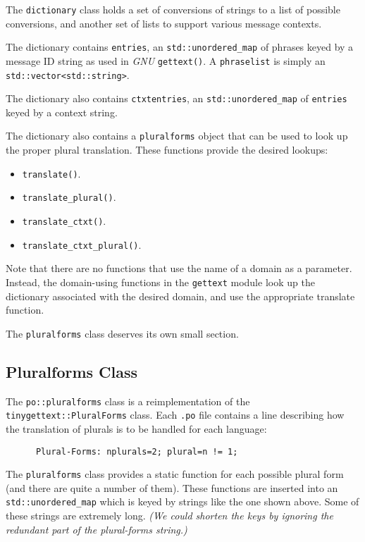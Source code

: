    The \texttt{dictionary} class holds a set of conversions of strings to a
   list of possible conversions, and another set of lists to support various
   message contexts.

   The dictionary contains \texttt{entries}, an \texttt{std::unordered\_map}
   of phrases keyed by a message ID string as used in \textsl{GNU}
   \texttt{gettext()}.
   A \texttt{phraselist} is simply an \texttt{std::vector<std::string>}.

   The dictionary also contains \texttt{ctxtentries},
   an \texttt{std::unordered\_map} of \texttt{entries} keyed by a
   context string.

   The dictionary also contains a \texttt{pluralforms} object that can be used
   to look up the proper plural translation.
   These functions provide the desired lookups:

   \begin{itemize}
      \item \texttt{translate()}. 
      \item \texttt{translate\_plural()}. 
      \item \texttt{translate\_ctxt()}. 
      \item \texttt{translate\_ctxt\_plural()}. 
   \end{itemize}

   Note that there are no functions that use the name of a domain as
   a parameter.
   Instead, the domain-using functions in the \texttt{gettext} module
   look up the dictionary associated with the desired domain, 
   and use the appropriate translate function.

   The \texttt{pluralforms} class deserves its own small section.

\subsection{Pluralforms Class}
\label{subsec:potext_pluralforms_class}

   The \texttt{po::pluralforms} class is a reimplementation of the
   \texttt{tinygettext::PluralForms} class.
   Each \texttt{.po} file contains a line describing how the translation of
   plurals is to be handled for each language:

   \begin{verbatim}
      Plural-Forms: nplurals=2; plural=n != 1;
   \end{verbatim}
   
   The \texttt{pluralforms} class provides a static function for each
   possible plural form (and there are quite a number of them).
   These functions are inserted into an \texttt{std::unordered\_map}
   which is keyed by strings like the one shown above.
   Some of these strings are extremely long.
   \textsl{(We could shorten the keys by ignoring the redundant part
   of the plural-forms string.)}

